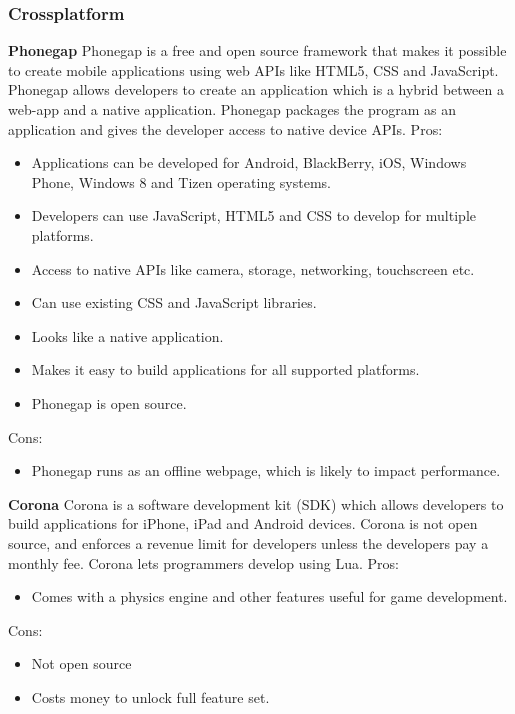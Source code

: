 \subsubsection{Crossplatform}
{\bf Phonegap}
Phonegap is a free and open source framework that makes it possible to create mobile applications using web APIs like HTML5, CSS and JavaScript. Phonegap allows developers to create an application which is a hybrid between a web-app and a native application. Phonegap packages the program as an application and gives the developer access to native device APIs.
\linebreak
Pros:
\begin{itemize}
  \item Applications can be developed for Android, BlackBerry, iOS, Windows Phone, Windows 8 and Tizen operating systems.
  \item Developers can use JavaScript, HTML5 and CSS to develop for multiple platforms.
  \item Access to native APIs like camera, storage, networking, touchscreen etc.
  \item Can use existing CSS and JavaScript libraries.
  \item Looks like a native application.
  \item Makes it easy to build applications for all supported platforms.
  \item Phonegap is open source.
\end{itemize}
Cons:
\begin{itemize}
  \item Phonegap runs as an offline webpage, which is likely to impact performance.
\end{itemize}
\linebreak
{\bf Corona}
Corona is a software development kit (SDK) which allows developers to build applications for iPhone, iPad and Android devices. Corona is not open source, and enforces a revenue limit for developers unless the developers pay a monthly fee. Corona lets programmers develop using Lua.
\linebreak
Pros:
\begin{itemize}
  \item Comes with a physics engine and other features useful for game development.
\end{itemize}
Cons:
\begin{itemize}
  \item Not open source
  \item Costs money to unlock full feature set.
\end{itemize}
\linebreak
